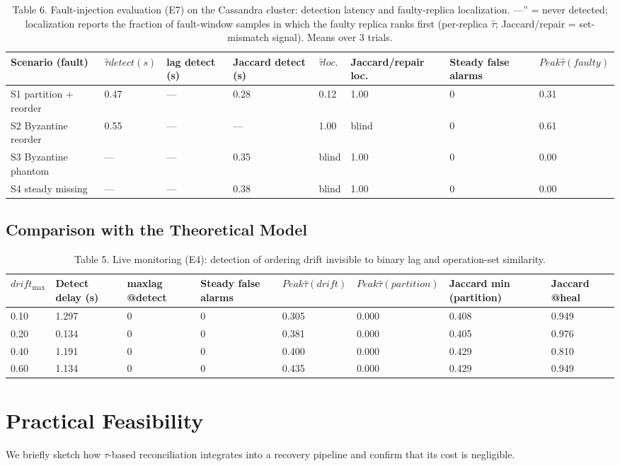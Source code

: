 \documentclass[journal]{IEEEtran}
\begin{document}
\begin{table}[t]
\centering
\caption{Table 6. Fault-injection evaluation (E7) on the Cassandra cluster: detection latency and faulty-replica localization. —” = never detected; localization reports the fraction of fault-window samples in which the faulty replica ranks first (per-replica $\hat{\tau}$; Jaccard/repair = set-mismatch signal). Means over 3 trials.}
\begin{tabular}{llllllll}
\hline
Scenario (fault) & $\hat{\tau} detect (s)$ & lag detect (s) & Jaccard detect (s) & $\hat{\tau} loc.$ & Jaccard/repair loc. & Steady false alarms & $Peak \hat{\tau} (faulty)$ \\
\hline
S1 partition + reorder & 0.47 & — & 0.28 & 0.12 & 1.00 & 0 & 0.31 \\
S2 Byzantine reorder & 0.55 & — & — & 1.00 & blind & 0 & 0.61 \\
S3 Byzantine phantom & — & — & 0.35 & blind & 1.00 & 0 & 0.00 \\
S4 steady missing & — & — & 0.38 & blind & 1.00 & 0 & 0.00 \\
\hline
\end{tabular}
\end{table}

\subsection{Comparison with the Theoretical Model}
\begin{table}[t]
\centering
\caption{Table 5. Live monitoring (E4): detection of ordering drift invisible to binary lag and operation-set similarity.}
\begin{tabular}{llllllll}
\hline
$drift_{\mathrm{max}}$ & Detect delay (s) & maxlag @detect & Steady false alarms & $Peak \hat{\tau} (drift)$ & $Peak \hat{\tau} (partition)$ & Jaccard min (partition) & Jaccard @heal \\
\hline
0.10 & 1.297 & 0 & 0 & 0.305 & 0.000 & 0.408 & 0.949 \\
0.20 & 0.134 & 0 & 0 & 0.381 & 0.000 & 0.405 & 0.976 \\
0.40 & 1.191 & 0 & 0 & 0.400 & 0.000 & 0.429 & 0.810 \\
0.60 & 1.134 & 0 & 0 & 0.435 & 0.000 & 0.429 & 0.949 \\
\hline
\end{tabular}
\end{table}

\section{Practical Feasibility}
We briefly sketch how $\tau$-based reconciliation integrates into a recovery pipeline and confirm that its cost is negligible.
\end{document}
